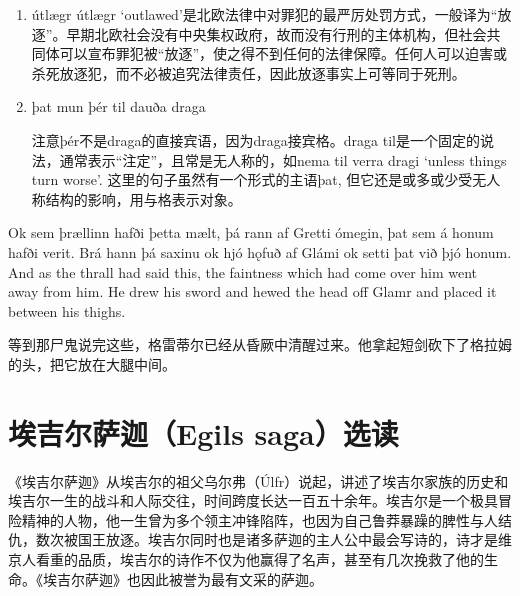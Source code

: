 \begin{grammar*}{}
    \begin{enumerate}[leftmargin=*]
        \item útlægr
              útlægr `outlawed'是北欧法律中对罪犯的最严厉处罚方式，一般译为“放逐”。早期北欧社会没有中央集权政府，故而没有行刑的主体机构，但社会共同体可以宣布罪犯被“放逐”，使之得不到任何的法律保障。任何人可以迫害或杀死放逐犯，而不必被追究法律责任，因此放逐事实上可等同于死刑。
        \item þat mun þér til dauða draga

              注意þér不是draga的直接宾语，因为draga接宾格。draga til是一个固定的说法，通常表示“注定”，且常是无人称的，如nema til verra dragi `unless things turn worse'. 这里的句子虽然有一个形式的主语þat, 但它还是或多或少受无人称结构的影响，用与格表示对象。
    \end{enumerate}
\end{grammar*}
\begin{paracol}{2}
    Ok sem þrællinn hafði þetta mælt, þá rann af Gretti ómegin, þat sem á honum hafði verit. Brá hann þá saxinu ok hjó hǫfuð af Glámi ok setti þat við þjó honum.
    \switchcolumn
    And as the thrall had said this, the faintness which had come over him went away from him. He drew his sword and hewed the head off Glamr and placed it between his thighs.
\end{paracol}
\begin{translation*}{}
    等到那尸鬼说完这些，格雷蒂尔已经从昏厥中清醒过来。他拿起短剑砍下了格拉姆的头，把它放在大腿中间。
\end{translation*}

\section{埃吉尔萨迦（Egils saga）选读}
《埃吉尔萨迦》从埃吉尔的祖父乌尔弗（Úlfr）说起，讲述了埃吉尔家族的历史和埃吉尔一生的战斗和人际交往，时间跨度长达一百五十余年。埃吉尔是一个极具冒险精神的人物，他一生曾为多个领主冲锋陷阵，也因为自己鲁莽暴躁的脾性与人结仇，数次被国王放逐。埃吉尔同时也是诸多萨迦的主人公中最会写诗的，诗才是维京人看重的品质，埃吉尔的诗作不仅为他赢得了名声，甚至有几次挽救了他的生命。《埃吉尔萨迦》也因此被誉为最有文采的萨迦。

